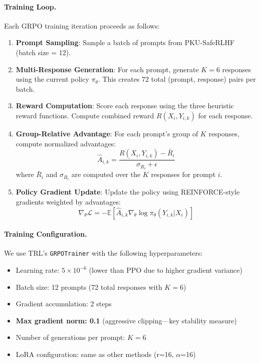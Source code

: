 \paragraph{Training Loop.} Each GRPO training iteration proceeds as follows:

\begin{enumerate}[leftmargin=*]
    \item \textbf{Prompt Sampling}: Sample a batch of prompts from PKU-SafeRLHF (batch size = 12).

    \item \textbf{Multi-Response Generation}: For each prompt, generate $K=6$ responses using the current policy $\pi_\theta$. This creates 72 total (prompt, response) pairs per batch.

    \item \textbf{Reward Computation}: Score each response using the three heuristic reward functions. Compute combined reward $R(X_i, Y_{i,k})$ for each response.

    \item \textbf{Group-Relative Advantage}: For each prompt's group of $K$ responses, compute normalized advantages:
    \begin{equation*}
        \hat{A}_{i,k} = \frac{R(X_i, Y_{i,k}) - \bar{R}_i}{\sigma_{R_i} + \epsilon}
    \end{equation*}
    where $\bar{R}_i$ and $\sigma_{R_i}$ are computed over the $K$ responses for prompt $i$.

    \item \textbf{Policy Gradient Update}: Update the policy using REINFORCE-style gradients weighted by advantages:
    \begin{equation*}
        \nabla_\theta \mathcal{L} = -\mathbb{E}\left[ \hat{A}_{i,k} \nabla_\theta \log \pi_\theta(Y_{i,k} | X_i) \right]
    \end{equation*}
\end{enumerate}

\paragraph{Training Configuration.} We use TRL's \texttt{GRPOTrainer} with the following hyperparameters:
\begin{itemize}[leftmargin=*]
    \item Learning rate: $5 \times 10^{-6}$ (lower than PPO due to higher gradient variance)
    \item Batch size: 12 prompts (72 total responses with $K=6$)
    \item Gradient accumulation: 2 steps
    \item \textbf{Max gradient norm: 0.1} (aggressive clipping---key stability measure)
    \item Number of generations per prompt: $K=6$
    \item LoRA configuration: same as other methods (r=16, $\alpha$=16)
\end{itemize}

